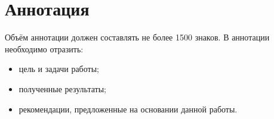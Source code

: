 \chapter*{Аннотация}                        %

Объём аннотации должен составлять не более 1500 знаков.
В аннотации необходимо отразить:
\begin{itemize}
  \item цель и задачи работы;
  \item полученные результаты;
  \item рекомендации, предложенные на основании данной работы.
\end{itemize}
